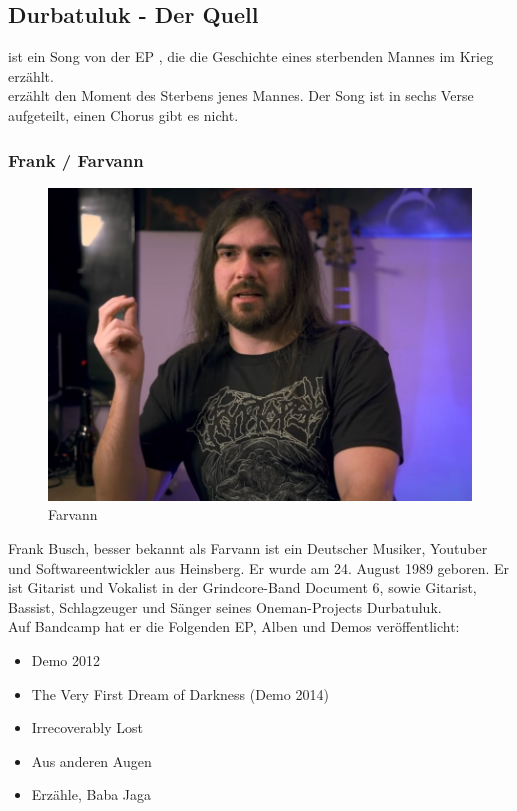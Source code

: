 \documentclass[twocolumn,10pt]{article}
\begin{document}
		\subsection{Durbatuluk - Der Quell}
			 ist ein Song von der EP , die die Geschichte eines sterbenden Mannes im Krieg erzählt.\cite{Mail}\\
			 erzählt den Moment des Sterbens jenes Mannes. Der Song ist in sechs Verse aufgeteilt, einen Chorus gibt es nicht.
			\subsubsection{Frank / Farvann}
			\begin{figure}
				\includegraphics[width=\linewidth]{farvann.jpg}
				\caption{Farvann \cite{farvannImg}}
			\end{figure}
			Frank Busch, besser bekannt als Farvann\cite{farvann2023} ist ein Deutscher Musiker\cite{durbatulukbandcamp}, Youtuber\cite{youtubefarvann} und Softwareentwickler aus Heinsberg. Er wurde am 24. August 1989 geboren. Er ist Gitarist und Vokalist in der Grindcore-Band Document 6, sowie Gitarist, Bassist, Schlagzeuger und Sänger seines Oneman-Projects Durbatuluk.\\
			Auf Bandcamp\cite{durbatulukbandcamp} hat er die Folgenden EP, Alben und Demos veröffentlicht:
			\begin{itemize}
				\item Demo 2012
				\item The Very First Dream of Darkness (Demo 2014)
				\item Irrecoverably Lost
				\item Aus anderen Augen
				\item Erzähle, Baba Jaga
			\end{itemize}
		
\end{document}
